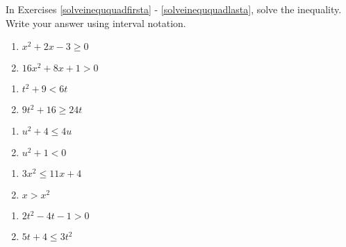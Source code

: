 \documentclass{ximera}
\begin{document}
In Exercises \ref{solveineququadfirsta} - \ref{solveineququadlasta}, solve the inequality.  Write your answer using interval notation.

\begin{multicols}{2}
\begin{enumerate}
\setcounter{enumi}{\value{HW}}

\item $x^{2} + 2x - 3 \geq 0$  \label{solveineququadfirsta}
\item  $16x^2+8x+1 > 0$

\setcounter{HW}{\value{enumi}}
\end{enumerate}
\end{multicols}

\begin{multicols}{2}
\begin{enumerate}
\setcounter{enumi}{\value{HW}}


\item  $t^2+9 < 6t$
\item  $9t^2 + 16 \geq 24t$


\setcounter{HW}{\value{enumi}}
\end{enumerate}
\end{multicols}

\begin{multicols}{2}
\begin{enumerate}
\setcounter{enumi}{\value{HW}}

\item  $u^2+4 \leq 4u$
\item $u^{2} + 1 < 0$


\setcounter{HW}{\value{enumi}}
\end{enumerate}
\end{multicols}

\begin{multicols}{2}
\begin{enumerate}
\setcounter{enumi}{\value{HW}}

\item $3x^{2} \leq 11x + 4$
\item $x > x^{2}$


\setcounter{HW}{\value{enumi}}
\end{enumerate}
\end{multicols}

\begin{multicols}{2}
\begin{enumerate}
\setcounter{enumi}{\value{HW}}

\item  $2t^2-4t-1 > 0$
\item  $5t+4 \leq 3t^2$


\setcounter{HW}{\value{enumi}}
\end{enumerate}
\end{multicols}
\end{document}
